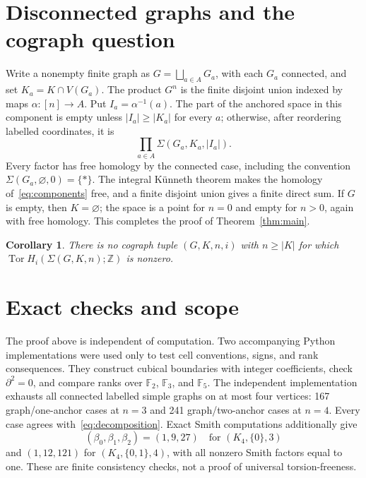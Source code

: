 \documentclass[11pt]{article}
\newtheorem{corollary}[theorem]{Corollary}
\newcommand{\Z}{\mathbb Z}
\begin{document}
\section{Disconnected graphs and the cograph question}

Write a nonempty finite graph as $G=\bigsqcup_{a\in A}G_a$, with each $G_a$ connected, and set $K_a=K\cap V(G_a)$.  The product $G^n$ is the finite disjoint union indexed by maps $\alpha:[n]\to A$.  Put $I_a=\alpha^{-1}(a)$.  The part of the anchored space in this component is empty unless $|I_a|\geq |K_a|$ for every $a$; otherwise, after reordering labelled coordinates, it is
\begin{equation}\label{eq:components}
 \prod_{a\in A}\Sigma(G_a,K_a,|I_a|).
\end{equation}
Every factor has free homology by the connected case, including the convention $\Sigma(G_a,\varnothing,0)=\{*\}$.  The integral K\"unneth theorem makes the homology of~\eqref{eq:components} free, and a finite disjoint union gives a finite direct sum.  If $G$ is empty, then $K=\varnothing$; the space is a point for $n=0$ and empty for $n>0$, again with free homology.  This completes the proof of Theorem~\ref{thm:main}.

\begin{corollary}
There is no cograph tuple $(G,K,n,i)$ with $n\geq|K|$ for which $\operatorname{Tor}H_i(\Sigma(G,K,n);\Z)$ is nonzero.
\end{corollary}

\section{Exact checks and scope}

The proof above is independent of computation.  Two accompanying Python implementations were used only to test cell conventions, signs, and rank consequences.  They construct cubical boundaries with integer coefficients, check $\partial^2=0$, and compare ranks over $\mathbb F_2$, $\mathbb F_3$, and $\mathbb F_5$.  The independent implementation exhausts all connected labelled simple graphs on at most four vertices: 167 graph/one-anchor cases at $n=3$ and 241 graph/two-anchor cases at $n=4$.  Every case agrees with~\eqref{eq:decomposition}.  Exact Smith computations additionally give
\[
 (\beta_0,\beta_1,\beta_2)=(1,9,27)
 \quad\text{for }(K_4,\{0\},3)
\]
and $(1,12,121)$ for $(K_4,\{0,1\},4)$, with all nonzero Smith factors equal to one.  These are finite consistency checks, not a proof of universal torsion-freeness.
\end{document}
